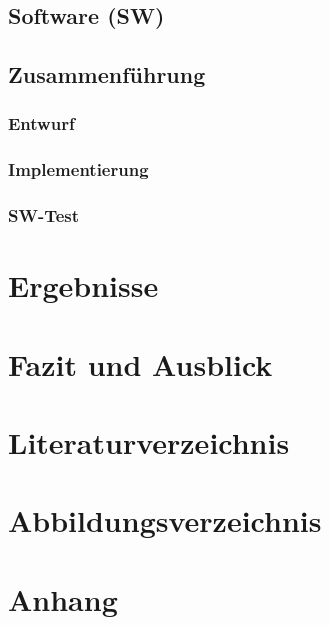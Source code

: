 \documentclass[a4paper, portrait, 12pt]{scrartcl} %
\begin{document}
\subsection{Software (SW)}

\subsection{Zusammenführung}
\subsubsection{Entwurf}
\subsubsection{Implementierung}
\subsubsection{SW-Test}

\pagebreak


\pagebreak

\section{Ergebnisse}

\pagebreak

\section{Fazit und Ausblick}

\pagebreak

\section{Literaturverzeichnis}
\printbibliography
\pagebreak

\section{Abbildungsverzeichnis}
\listoffigures
\pagebreak




\appendix
\section{Anhang}
\label{sec:appendix_a}

  
\end{document}
